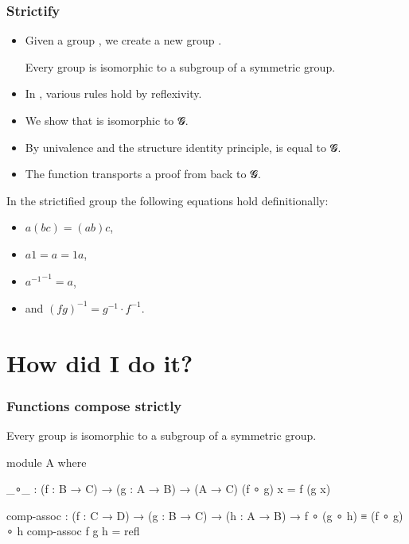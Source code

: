 \documentclass[aspectratio=169,presentation]{beamer}
\begin{document}
\begin{frame}
  \frametitle{Strictify}
  \begin{itemize}
  \item Given a group , we create a new group \AgdaSpace{}.
    \begin{theorem}
      Every group is isomorphic to a subgroup of a symmetric group.
    \end{theorem}
  \item In \AgdaSpace{}, various rules hold by reflexivity.
  \item We show that \AgdaSpace{} is isomorphic to 𝓖.
  \item By univalence and the structure identity principle, \AgdaSpace{} is equal to 𝓖.
  \item The  function transports a proof from \AgdaSpace{} back to 𝓖.
  \end{itemize}
\end{frame}


\begin{frame}
   In the strictified group the following equations hold definitionally:
  \begin{itemize}
  \item \(a  (b c) = (a b) c\),
  \item \(a 1 = a = 1 a\),
  \item \({a^{-1}}^{-1} = a\),
  \item and \((f g)^{-1} = g^{-1} \cdot f^{-1}\).
  \end{itemize}
\end{frame}

\section{How did I do it?}

\begin{frame}
  \frametitle{Functions compose strictly}
  \begin{theorem}
    Every group is isomorphic to a subgroup of a symmetric group.
  \end{theorem}

  \pause{}
  \begin{code}[hide]
    module A where
  \end{code}
  \begin{code}
      _∘_ : (f : B → C) → (g : A → B) → (A → C)
      (f ∘ g) x = f (g x)

      comp-assoc  :  (f : C → D)
                  →  (g : B → C)
                  →  (h : A → B)
                  →  f ∘ (g ∘ h) ≡ (f ∘ g) ∘ h
      comp-assoc f g h = refl
  \end{code}
\end{frame}
\end{document}
